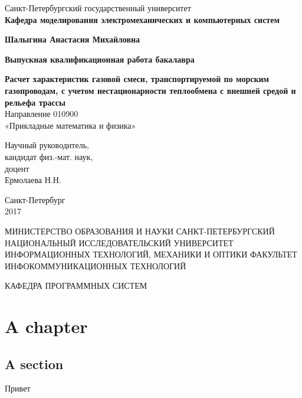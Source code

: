 \documentclass[14pt,a4paper,report]{extreport}
\begin{document}
	\begin{titlepage}
	\begin{center}
		\fontsize{12pt}{10pt}\selectfont		
		Санкт-Петербургский государственный университет \\
		\vspace*{.6\baselineskip}
		\fontsize{12pt}{10pt}\selectfont
	\textbf{	Кафедра моделирования электромеханических и компьютерных систем }
		
		\vspace*{6\baselineskip}
		\fontsize{20pt}{18pt}\selectfont
	\textbf{Шалыгина Анастасия Михайловна}
	
		\vspace*{2\baselineskip}
		\fontsize{19pt}{18pt}\selectfont
		\textbf{Выпускная квалификационная работа бакалавра}	
		
		\vspace*{3\baselineskip}
		\fontsize{20pt}{18pt}\selectfont
\textbf{Расчет характеристик газовой смеси, транспортируемой по морским газопроводам, с учетом нестационарности теплообмена с внешней средой и рельефа трассы }\\
		\vspace*{1.15\baselineskip}
		\fontsize{15pt}{18pt}\selectfont
		Направление 010900\\
		«Прикладные математика и физика»\\
	\end{center}
\vspace*{2\baselineskip}
\begin{flushright}
	\fontsize{13pt}{10pt}\selectfont
	Научный руководитель,\\
	кандидат физ.-мат. наук,\\
	доцент\\
	Ермолаева Н.Н.\\
\end{flushright}
\vspace*{3\baselineskip}
\begin{center}
	Санкт-Петербург\\
	2017
\end{center}
\end{titlepage}

\begin{center}
МИНИСТЕРСТВО ОБРАЗОВАНИЯ И НАУКИ САНКТ-ПЕТЕРБУРГСКИЙ НАЦИОНАЛЬНЫЙ ИССЛЕДОВАТЕЛЬСКИЙ УНИВЕРСИТЕТ ИНФОРМАЦИОННЫХ ТЕХНОЛОГИЙ, МЕХАНИКИ И ОПТИКИ
ФАКУЛЬТЕТ ИНФОКОММУНИКАЦИОННЫХ ТЕХНОЛОГИЙ

КАФЕДРА ПРОГРАММНЫХ СИСТЕМ
\end{center}

\pagebreak

\chapter{A chapter}
\lipsum[1]
\section{A section}
\lipsum[2]
Привет
\end{document}
